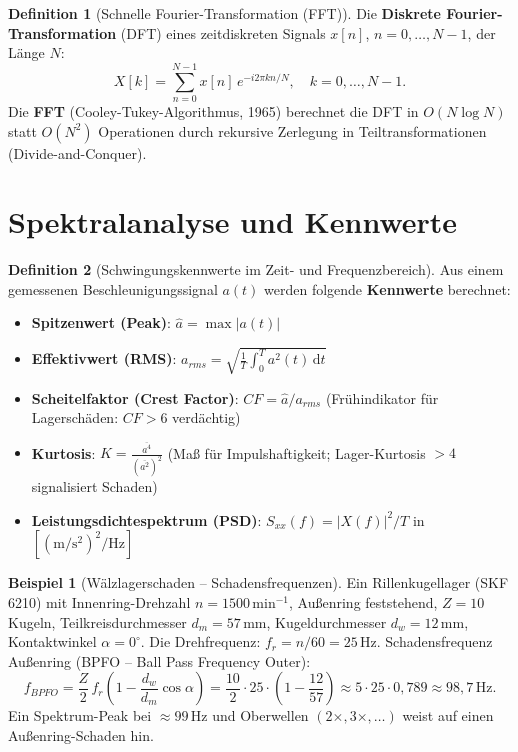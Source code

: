 ﻿\documentclass[a4paper,12pt]{report}
\theoremstyle{definition}
\newtheorem{definition}{Definition}
\newtheorem{beispiel}{Beispiel}
\begin{document}
\begin{definition}[Schnelle Fourier-Transformation (FFT)]
Die \textbf{Diskrete Fourier-Transformation} (DFT) eines zeitdiskreten Signals
$x[n]$, $n = 0, \ldots, N-1$, der Länge $N$:
\[
  X[k] = \sum_{n=0}^{N-1} x[n]\,e^{-i 2\pi kn/N}, \quad k = 0, \ldots, N-1.
\]
Die \textbf{FFT} (Cooley-Tukey-Algorithmus, 1965) berechnet die DFT
in $O(N\log N)$ statt $O(N^2)$ Operationen durch rekursive Zerlegung
in Teiltransformationen (Divide-and-Conquer).
\end{definition}

\section{Spektralanalyse und Kennwerte}

\begin{definition}[Schwingungskennwerte im Zeit- und Frequenzbereich]
Aus einem gemessenen Beschleunigungssignal $a(t)$ werden folgende
\textbf{Kennwerte} berechnet:
\begin{itemize}
    \item[-] \textbf{Spitzenwert (Peak)}: $\hat{a} = \max|a(t)|$
    \item[-] \textbf{Effektivwert (RMS)}: $a_{rms} = \sqrt{\frac{1}{T}\int_0^T a^2(t)\,\mathrm{d}t}$
    \item[-] \textbf{Scheitelfaktor (Crest Factor)}: $CF = \hat{a}/a_{rms}$
          (Frühindikator für Lagerschäden: $CF > 6$ verdächtig)
    \item[-] \textbf{Kurtosis}: $K = \frac{\overline{a^4}}{(\overline{a^2})^2}$
          (Maß für Impulshaftigkeit; Lager-Kurtosis $> 4$ signalisiert Schaden)
    \item[-] \textbf{Leistungsdichtespektrum (PSD)}: $S_{xx}(f) = |X(f)|^2/T$
          in $[\mathrm{(m/s^2)^2/Hz}]$
\end{itemize}
\end{definition}

\begin{beispiel}[Wälzlagerschaden -- Schadensfrequenzen]
Ein Rillenkugellager (SKF 6210) mit Innenring-Drehzahl $n = 1500\,\mathrm{min^{-1}}$,
Außenring feststehend, $Z = 10$ Kugeln, Teilkreisdurchmesser $d_m = 57\,\mathrm{mm}$,
Kugeldurchmesser $d_w = 12\,\mathrm{mm}$, Kontaktwinkel $\alpha = 0^\circ$.
Die Drehfrequenz: $f_r = n/60 = 25\,\mathrm{Hz}$.
Schadensfrequenz Außenring (BPFO -- Ball Pass Frequency Outer):
\[
  f_{BPFO} = \frac{Z}{2}\,f_r\left(1 - \frac{d_w}{d_m}\cos\alpha\right)
  = \frac{10}{2}\cdot 25\cdot\left(1 - \frac{12}{57}\right)
  \approx 5\cdot25\cdot0{,}789 \approx 98{,}7\,\mathrm{Hz}.
\]
Ein Spektrum-Peak bei $\approx 99\,\mathrm{Hz}$ und Oberwellen $(2\times, 3\times, \ldots)$
weist auf einen Außenring-Schaden hin.
\end{beispiel}
\end{document}
